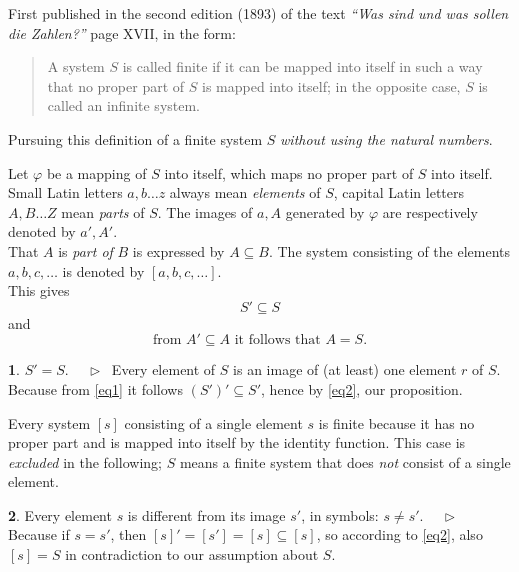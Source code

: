 \documentclass[leqno,hidelinks]{article}
\theoremstyle{definition}
\newtheorem{satz}{\protect\satzname}
\newcommand{\satzname}{}
\renewcommand{\satzname}{\hspace{-4pt}.\ Satz}%
\renewcommand{\satzname}{\hspace{-4pt}.\ Theorem}%
\newcommand\Beweis{\medskip \newline $ \phantom{'.'} \rhd \ $}%
\newcommand{\partof}{\subseteq}
\begin{document}
\begin{paracol}{2}


\switchcolumn
{}

\noindent First published in the second edition (1893) of the text
\textit{``Was sind und was sollen die Zahlen?''} page XVII, in the form:%

\begin{quote}
A system $S$ is called finite if it can be mapped into itself in such a way that
no proper part of $S$ is mapped into itself; in the opposite case, $S$ is called
an infinite system.
\end{quote}

Pursuing this definition of a finite system $S$ \emph{without using the natural numbers}.

Let $\varphi$ be a mapping of $S$ into itself, which maps no proper part of $S$
into itself. Small Latin letters $a, b \ldots z$ always mean \emph{elements} of
$S$, capital Latin letters $A, B \ldots Z$ mean \emph{parts} of $S$. The images
of $a, A$ generated by $\varphi$ are respectively denoted by $a', A'$.
\ \\

That $A$ is \emph{part of} $B$ is expressed by $A \partof B$. The system consisting
of the elements $a, b, c, \ldots$ is denoted by $[a, b, c, \ldots]$.
\ \\

This gives
\begin{equation}\label{eq1}
				S' \partof S
\end{equation}
and %
\begin{equation}\label{eq2}
		\text{from } A' \partof A \text{ it follows that } A = S.
\end{equation}

\begin{satz}\label{thm1}$S' = S$.
\Beweis
Every element of $S$ is an image of (at least) one element $r$ of $S$. Because
from \eqref{eq1} it follows $(S')' \partof S'$, hence by \eqref{eq2}, our proposition.
\end{satz}
Every system $[s]$ consisting of a single element $s$ is finite because it has
no proper part and is mapped into itself by the identity function. This case is
\emph{excluded} in the following; $S$ means a finite system that does \emph{not}
consist of a single element.

\begin{satz}\label{thm2}
Every element $s$ is different from its image $s'$, in symbols: $s \neq s'$.
\Beweis
Because if $s = s'$, then $[s]' = [s'] = [s] \partof [s]$, so according to
\eqref{eq2}, also $[s] = S$ in contradiction to our assumption about $S$.
\end{satz}


\end{paracol}
\end{document}
